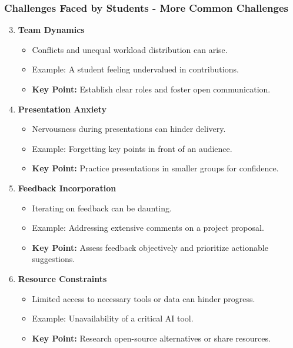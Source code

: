 \documentclass{beamer}
\begin{document}
\begin{frame}[fragile]
    \frametitle{Challenges Faced by Students - More Common Challenges}
    \begin{enumerate}
        \setcounter{enumi}{2} %
        \item \textbf{Team Dynamics}
            \begin{itemize}
                \item Conflicts and unequal workload distribution can arise.
                \item Example: A student feeling undervalued in contributions.
                \item \textbf{Key Point:} Establish clear roles and foster open communication.
            \end{itemize}

        \item \textbf{Presentation Anxiety}
            \begin{itemize}
                \item Nervousness during presentations can hinder delivery.
                \item Example: Forgetting key points in front of an audience.
                \item \textbf{Key Point:} Practice presentations in smaller groups for confidence.
            \end{itemize}

        \item \textbf{Feedback Incorporation}
            \begin{itemize}
                \item Iterating on feedback can be daunting.
                \item Example: Addressing extensive comments on a project proposal.
                \item \textbf{Key Point:} Assess feedback objectively and prioritize actionable suggestions.
            \end{itemize}

        \item \textbf{Resource Constraints}
            \begin{itemize}
                \item Limited access to necessary tools or data can hinder progress.
                \item Example: Unavailability of a critical AI tool.
                \item \textbf{Key Point:} Research open-source alternatives or share resources.
            \end{itemize}
    \end{enumerate}
\end{frame}
\end{document}
